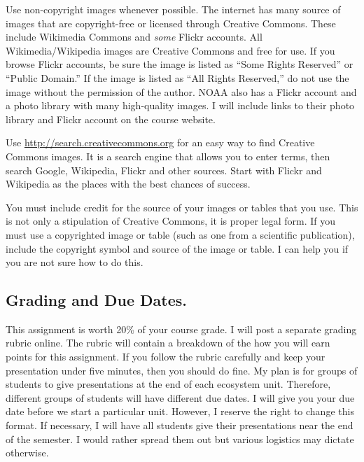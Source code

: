 \documentclass[letterpaper]{memoir}
\newcommand{\insertslide}[2]{%
  \framebox{\texttt{[image: \#2]}}
}
\begin{document}
\sidepar{\insertslide{15}{5_in_5_overview.pdf}}
Use non-copyright images whenever possible. The internet has many source of images that are copyright-free or licensed through Creative Commons. These include Wikimedia Commons and \emph{some} Flickr accounts. All Wikimedia/Wikipedia images are Creative Commons and free for use. If you browse Flickr accounts, be sure the image is listed as “Some Rights Reserved” or ``Public Domain.'' If the image is listed as “All Rights Reserved,” do not use the image without the permission of the author. NOAA also has a Flickr account and a photo library with many high-quality images. I will include links to their photo library and Flickr account on the course website.

Use \url{http://search.creativecommons.org} for an easy way to find Creative Commons images. It is a search engine that allows you to enter terms, then search Google, Wikipedia, Flickr and other sources. Start with Flickr and Wikipedia as the places with the best chances of success.

You must include credit for the source of your images or tables that you use.  This is not only a stipulation of Creative Commons, it is proper legal form. If you must use a copyrighted image or table (such as one from a scientific publication), include the copyright symbol and source of the image or table.  I can help you if you are not sure how to do this.

\subsection*{Grading and Due Dates.}

\sidepar{\insertslide{17}{5_in_5_overview.pdf}}
This assignment is worth 20\% of your course grade. I will post a separate grading rubric online. The rubric will contain a breakdown of the how you will earn points for this assignment. If you follow the rubric carefully and keep your presentation under five minutes, then you should do fine.  My plan is for groups of students to give presentations at the end of each ecosystem unit.  Therefore, different groups of students will have different due dates. I will give you your due date before we start a particular unit.  However, I reserve the right to change this format. If necessary, I will have all students give their presentations near the end of the semester. I would rather spread them out but various logistics may dictate otherwise.
\end{document}
